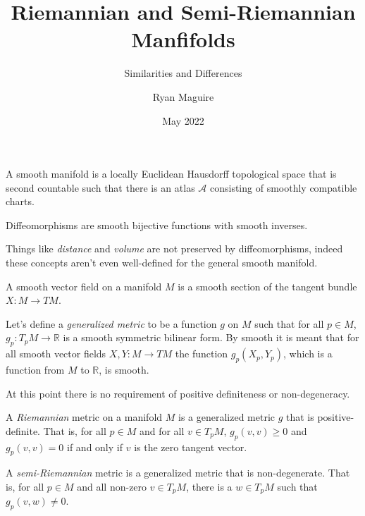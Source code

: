 \documentclass{beamer}
\title{Riemannian and Semi-Riemannian Manfifolds}
\subtitle{Similarities and Differences}
\author{Ryan Maguire}
\date{May 2022}
\begin{document}
    \maketitle
    \begin{frame}
        A smooth manifold is a locally Euclidean Hausdorff topological space
        that is second countable such that there is an atlas $\mathcal{A}$
        consisting of smoothly compatible charts.
        \par\hfill\par
        Diffeomorphisms are
        smooth bijective functions with smooth inverses.
        \par\hfill\par
        Things like \textit{distance} and \textit{volume} are not preserved by
        diffeomorphisms, indeed these concepts aren't even well-defined for
        the general smooth manifold.
    \end{frame}
    \begin{frame}
        A smooth vector field on a manifold $M$ is a smooth section of the
        tangent bundle $X:M\rightarrow{TM}$.
        \par\hfill\par
        Let's define a
        \textit{generalized metric} to be a function $g$ on $M$ such that for
        all $p\in{M}$, $g_{p}:T_{p}M\rightarrow\mathbb{R}$ is a smooth
        symmetric bilinear form. By smooth it is meant that for all smooth
        vector fields $X,Y:M\rightarrow{TM}$ the function
        $g_{p}(X_{p},Y_{p})$, which is a function from $M$ to $\mathbb{R}$, is
        smooth.
        \par\hfill\par
        At this point there is no requirement of positive definiteness
        or non-degeneracy.
    \end{frame}
    \begin{frame}
        A \textit{Riemannian} metric on a manifold $M$ is a generalized metric
        $g$ that is positive-definite. That is, for all $p\in{M}$ and for all
        $v\in{T}_{p}M$, $g_{p}(v,v)\geq{0}$ and $g_{p}(v,v)=0$ if and only if
        $v$ is the zero tangent vector.
        \par\hfill\par
        A \textit{semi-Riemannian} metric is a generalized metric that is
        non-degenerate. That is, for all $p\in{M}$ and all non-zero
        $v\in{T}_{p}M$, there is a $w\in{T}_{p}M$ such that
        $g_{p}(v,w)\ne{0}$.
    \end{frame}
\end{document}

